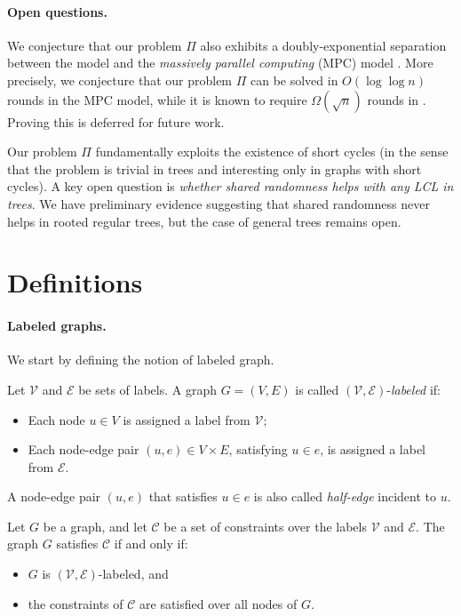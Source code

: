 \documentclass[11pt]{article}
\begin{document}
\paragraph{Open questions.}

We conjecture that our problem $\Pi$ also exhibits a doubly-exponential separation between the \randlcl model and the \emph{massively parallel computing} (MPC) model \cite{KarloffSV10}. More precisely, we conjecture that our problem $\Pi$ can be solved in $O(\log \log n)$ rounds in the MPC model, while it is known to require $\Omega(\sqrt{n})$ rounds in \randlcl. Proving this is deferred for future work.

Our problem $\Pi$ fundamentally exploits the existence of short cycles (in the sense that the problem is trivial in trees and interesting only in graphs with short cycles). A key open question is \emph{whether shared randomness helps with any LCL in trees}. We have preliminary evidence suggesting that shared randomness never helps in rooted regular trees, but the case of general trees remains open.


\section{Definitions}

\paragraph{Labeled graphs.}
We start by defining the notion of labeled graph.
\begin{definition}
	Let $\mathcal{V}$ and $\mathcal{E}$ be sets of labels. A graph $G = (V,E)$ is called $(\mathcal{V},\mathcal{E})$-\emph{labeled} if:
	\begin{itemize}[noitemsep]
		\item Each node $u \in V$ is assigned a label from $\mathcal{V}$;
		\item Each node-edge pair $(u,e) \in V \times E$, satisfying $u \in e$, is
		assigned a label from $\mathcal{E}$. 
	\end{itemize} 
	A node-edge pair $(u,e)$ that satisfies $u \in e$ is also called \emph{half-edge}  incident to $u$.
\end{definition}

\begin{definition}
	Let $G$ be a graph, and let $\mathcal{C}$ be a set of constraints over the labels
	$\mathcal{V}$ and $\mathcal{E}$. The graph $G$ satisfies $\mathcal{C}$ if and
	only if:
	\begin{itemize}[noitemsep]
		\item $G$ is $(\mathcal{V},\mathcal{E})$-labeled, and
		\item the constraints of $\mathcal{C}$ are satisfied over all nodes of $G$.
	\end{itemize}
\end{definition}
\end{document}
